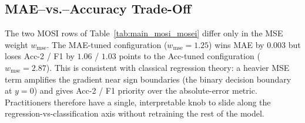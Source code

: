 \subsection{MAE--vs.--Accuracy Trade-Off}
\label{sec:analysis:tradeoff}

The two MOSI rows of Table~\ref{tab:main_mosi_mosei} differ only in the
MSE weight $w_{\text{mse}}$.
The MAE-tuned configuration ($w_{\text{mse}}\!=\!1.25$) wins MAE by
$0.003$ but loses Acc-2 / F1 by $1.06$ / $1.03$ points to the Acc-tuned
configuration ($w_{\text{mse}}\!=\!2.87$).
This is consistent with classical regression theory: a heavier MSE term
amplifies the gradient near sign boundaries (the binary decision
boundary at $y\!=\!0$) and gives Acc-2 / F1 priority over the
absolute-error metric.
Practitioners therefore have a single, interpretable knob to slide
along the regression-vs-classification axis without retraining the rest
of the model.
